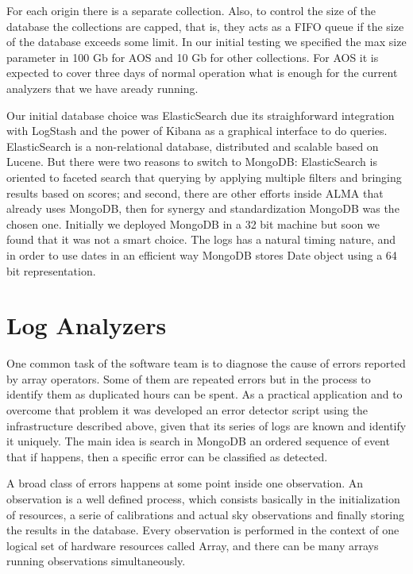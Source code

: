 \documentclass[]{spie}  %
\begin{document}
For each origin there is a separate collection. Also, to control the size of
the database the collections are capped, that is, they acts as a FIFO queue if
the size of the database exceeds some limit. In our initial testing we
specified the max size parameter in 100 Gb for AOS and 10 Gb for other
collections. For AOS it is expected to cover three days of normal operation
what is enough for the current analyzers that we have aready running.

Our initial database choice was ElasticSearch due its straighforward
integration with LogStash and the power of Kibana as a graphical interface to
do queries. ElasticSearch is a non-relational database, distributed and
scalable based on Lucene\cite{es}. But there were two reasons to switch to MongoDB:
ElasticSearch is oriented to faceted search that querying by applying multiple
filters and bringing results based on scores; and second, there are other
efforts inside ALMA that already uses MongoDB\cite{shenexploring}, then for
synergy and standardization MongoDB was the chosen one. Initially we deployed
MongoDB in a 32 bit machine but soon we found that it was not a smart choice.
The logs has a natural timing nature, and in order to use dates in an efficient
way MongoDB stores Date object using a  64 bit  representation.

\section{Log Analyzers}
One common task of the software team is to diagnose the cause of errors
reported by array operators. Some of them are repeated errors but in the
process to identify them as duplicated hours can be spent. As a practical
application and to overcome that problem it was developed an error detector
script using the infrastructure described above, given that its series of logs
are known and identify it uniquely. The main idea is search in MongoDB an
ordered sequence of event that if happens, then a specific error can be
classified as detected.

A broad class of errors happens at some point inside one observation. An
observation is a well defined process, which consists basically in the
initialization of resources, a serie of calibrations and actual sky
observations and finally storing the results in the database. Every observation
is performed in the context of one logical set of hardware resources called
Array, and there can be many arrays running observations simultaneously. 
\end{document}
